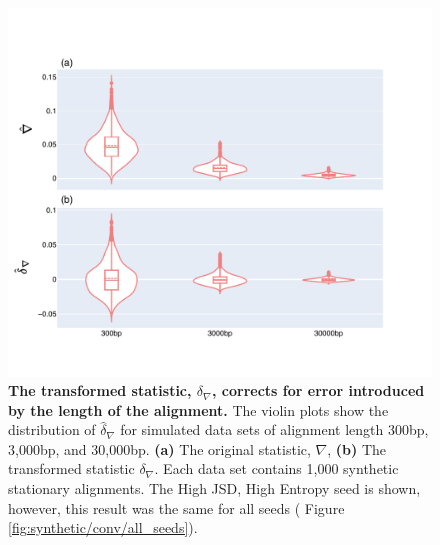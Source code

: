 \begin{figure}[htbp]
\centering
\includegraphics[width=\textwidth]{figures/plots/synthetic/d-conv-vs-conv/High JSD, High Entropy.pdf}
\caption{\textbf{The transformed statistic, $\delta_\nabla$, corrects for error introduced by the length of the alignment.} The violin plots show the distribution of $\hat \delta_\nabla$ for simulated data sets of alignment length 300bp, 3,000bp, and 30,000bp. \textbf{(a)} The original statistic, $\nabla$, \textbf{(b)} The transformed statistic $\delta_\nabla$. Each data set contains 1,000 synthetic stationary alignments. The High JSD, High Entropy seed is shown, however, this result was the same for all seeds ( Figure \ref{fig:synthetic/conv/all_seeds}).}
\label{fig:synthetic/d-conv-vs-conv/HighJSDHighEntropy}
\end{figure}